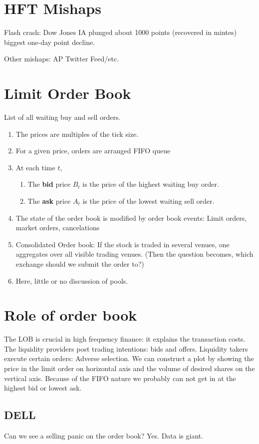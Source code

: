 \documentclass[twocolumn,openany]{book}
\begin{document}
\section{HFT Mishaps}
Flash crash: Dow Jones IA plunged about 1000 points (recovered in mintes) biggest one-day point decline.

Other mishaps: AP Twitter Feed/etc.

\section{Limit Order Book}
List of all waiting buy and sell orders.
\begin{enumerate}
	\item The prices are multiples of the tick size.
	\item For a given price, orders are arranged FIFO queue
	\item At each time $t$,
	\begin{enumerate}
		\item The {\bf bid} price $B_t$ is the price of the highest waiting buy order.
		\item The {\bf ask} price $A_t$ is the price of the lowest waiting sell order.
	\end{enumerate}
	\item The state of the order book is modified by order book events: Limit orders, market orders, cancelations
	\item Consolidated Order book: If the stock is traded in several venues, one aggregates over all visible trading venues. (Then the question becomes, which exchange should we submit the order to?)
	\item Here, little or no discussion of pools.
\end{enumerate}

\section{Role of order book}
The LOB is crucial in high frequency finance: it explains the transaction costs. 
The liquidity providers post trading intentions: bids and offers. 
Liquidity takers execute certain orders: Adverse selection. 
We can construct a plot by showing the price in the limit order on horizontal axis and the volume of desired shares on the vertical axis.
Because of the FIFO nature we probably can not get in at the highest bid or lowest ask.

\subsection{DELL}
Can we see a selling panic on the order book? Yes. Data is giant. 
\end{document}
